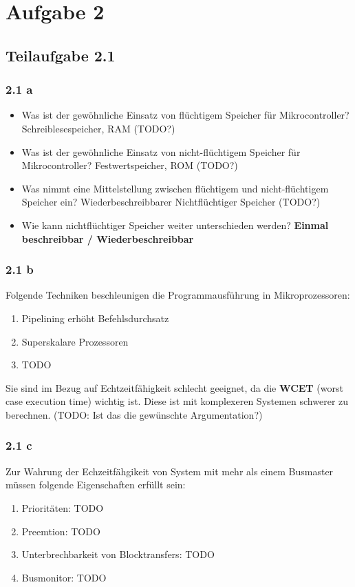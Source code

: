 \documentclass[a4paper]{scrartcl}
\begin{document}
  \section*{Aufgabe 2}
  \subsection*{Teilaufgabe 2.1}
  \subsubsection*{2.1 a}
  \begin{itemize}
      \item Was ist der gewöhnliche Einsatz von flüchtigem Speicher für Mikrocontroller?
            Schreiblesespeicher, RAM (TODO?)
      \item Was ist der gewöhnliche Einsatz von nicht-flüchtigem Speicher für Mikrocontroller?
            Festwertspeicher, ROM (TODO?)
      \item Was nimmt eine Mittelstellung zwischen flüchtigem und nicht-flüchtigem Speicher ein?
            Wiederbeschreibbarer Nichtflüchtiger Speicher (TODO?)
      \item Wie kann nichtflüchtiger Speicher weiter unterschieden werden?
            \textbf{Einmal beschreibbar / Wiederbeschreibbar}
  \end{itemize}

  \subsubsection*{2.1 b}
  Folgende Techniken beschleunigen die Programmausführung in Mikroprozessoren:
  \begin{enumerate}
      \item Pipelining erhöht Befehlsdurchsatz
      \item Superskalare Prozessoren
      \item TODO
  \end{enumerate}

  Sie sind im Bezug auf Echtzeitfähigkeit schlecht geeignet, da die \textbf{WCET}
  (worst case execution time) wichtig ist. Diese ist mit komplexeren Systemen
  schwerer zu berechnen. (TODO: Ist das die gewünschte Argumentation?)

  \subsubsection*{2.1 c}
  Zur Wahrung der Echzeitfähgikeit von System mit mehr als einem Busmaster
  müssen folgende Eigenschaften erfüllt sein:
  \begin{enumerate}
      \item Prioritäten: TODO
      \item Preemtion: TODO
      \item Unterbrechbarkeit von Blocktransfers: TODO
      \item Busmonitor: TODO
  \end{enumerate}
\end{document}
